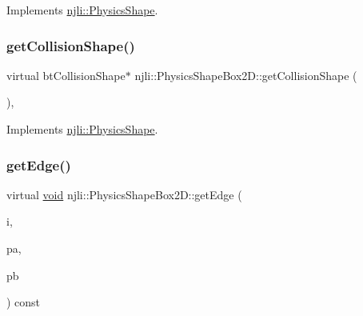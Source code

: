Implements \mbox{\hyperlink{classnjli_1_1_physics_shape_a527e956caca24bf16ed0d47f69ff14e8}{njli\+::\+Physics\+Shape}}.

\mbox{\label{classnjli_1_1_physics_shape_box2_d_a484e8759584df9acd50c60740906b201}} 
\subsubsection{\texorpdfstring{get\+Collision\+Shape()}{getCollisionShape()}\hspace{0.1cm}{\footnotesize\ttfamily [2/2]}}
{\footnotesize\ttfamily virtual bt\+Collision\+Shape$\ast$ njli\+::\+Physics\+Shape\+Box2\+D\+::get\+Collision\+Shape (\begin{DoxyParamCaption}{ }\end{DoxyParamCaption})\hspace{0.3cm}{\ttfamily [protected]}, {\ttfamily [virtual]}}



Implements \mbox{\hyperlink{classnjli_1_1_physics_shape_a2910f0362035c971f245349a55378b01}{njli\+::\+Physics\+Shape}}.

\mbox{\label{classnjli_1_1_physics_shape_box2_d_a34a87015a53f50f543d106bd3af1ab07}} 
\subsubsection{\texorpdfstring{get\+Edge()}{getEdge()}}
{\footnotesize\ttfamily virtual \mbox{\hyperlink{_thread_8h_af1e856da2e658414cb2456cb6f7ebc66}{void}} njli\+::\+Physics\+Shape\+Box2\+D\+::get\+Edge (\begin{DoxyParamCaption}\item[{int}]{i,  }\item[{bt\+Vector3 \&}]{pa,  }\item[{bt\+Vector3 \&}]{pb }\end{DoxyParamCaption}) const\hspace{0.3cm}{\ttfamily [virtual]}}

